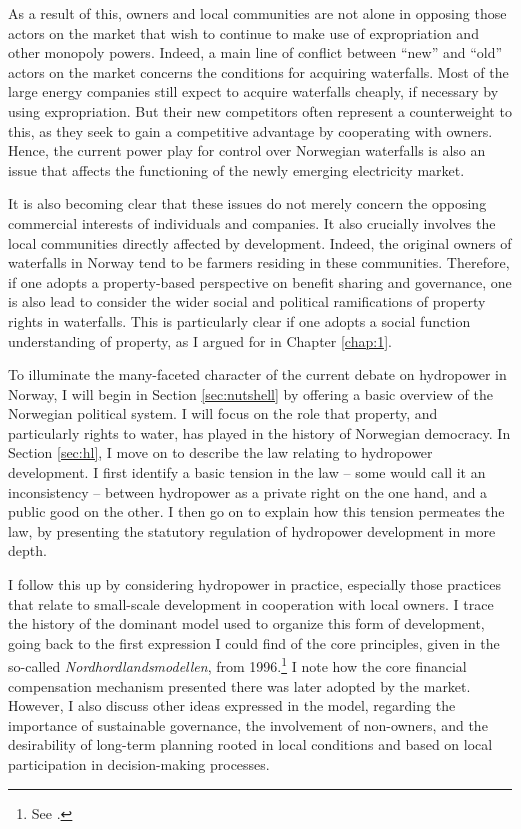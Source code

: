 As a result of this, owners and local communities are not alone in opposing those actors on the market that wish to continue to make use of expropriation and other monopoly powers. Indeed, a main line of conflict between ``new'' and ``old'' actors on the market concerns the conditions for acquiring waterfalls. Most of the large energy companies still expect to acquire waterfalls cheaply, if necessary by using expropriation. But their new competitors often represent a counterweight to this, as they seek to gain a competitive advantage by cooperating with owners. Hence, the current power play for control over Norwegian waterfalls is also an issue that affects the functioning of the newly emerging electricity market.  

It is also becoming clear that these issues do not merely concern the opposing commercial interests of individuals and companies. It also crucially involves the local communities directly affected by development. Indeed, the original owners of waterfalls in Norway tend to be farmers residing in these communities. Therefore, if one adopts a property-based perspective on benefit sharing and governance, one is also lead to consider the wider social and political ramifications of property rights in waterfalls. This is particularly clear if one adopts a social function understanding of property, as I argued for in Chapter \ref{chap:1}.

To illuminate the many-faceted character of the current debate on hydropower in Norway, I will begin in Section \ref{sec:nutshell} by offering a basic overview of the Norwegian political system. I will focus on the role that property, and particularly rights to water, has played in the history of Norwegian democracy. In Section \ref{sec:hl}, I move on to describe the law relating to hydropower development. I first identify a basic tension in the law -- some would call it an inconsistency -- between hydropower as a private right on the one hand, and a public good on the other. I then go on to explain how this tension permeates the law, by presenting the statutory regulation of hydropower development in more depth.

I follow this up by considering hydropower in practice, especially those practices that relate to small-scale development in cooperation with local owners. I trace the history of the dominant model used to organize this form of development, going back to the first expression I could find of the core principles, given in the so-called {\it Nordhordlandsmodellen}, from 1996.\footnote{See  \cite{dyrkolbotn96}.} I note how the core financial compensation mechanism presented there was later adopted by the market. However, I also discuss other ideas expressed in the model, regarding the importance of sustainable governance, the involvement of non-owners, and the desirability of long-term planning rooted in local conditions and based on local participation in decision-making processes.

